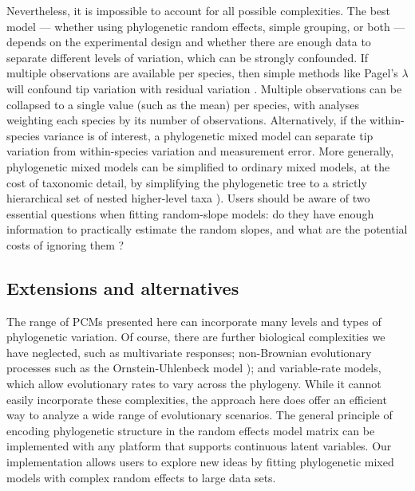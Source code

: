 \documentclass[12pt]{article}
\begin{document}
Nevertheless, it is impossible to account for all possible complexities.
The best model --- whether using phylogenetic random effects, simple grouping, or both --- depends on the experimental design and whether there are enough data to separate different levels of variation, which can be strongly confounded.
If multiple observations are available per species, then simple methods like Pagel's $\lambda$ will confound tip variation with residual variation \citep{boettiger2013is}.
Multiple observations can be collapsed to a single value (such as the mean) per species, with analyses weighting each species by its number of observations.
Alternatively, if the within-species variance is of interest, a phylogenetic mixed model can separate tip variation from within-species variation and measurement error.
More generally, phylogenetic mixed models can be simplified to ordinary mixed models, at the cost of taxonomic detail, by simplifying the phylogenetic tree to a strictly hierarchical set of nested higher-level taxa \citep{bunnefeld2012island}). 
Users should be aware of two essential questions when fitting random-slope models: do they have enough information to practically estimate the random slopes, and what are the potential costs of ignoring them \citep{schielzeth2008conclusions}? 

\subsection*{Extensions and alternatives}

The range of PCMs presented here can incorporate many levels and types of phylogenetic variation.
Of course, there are further biological complexities we have neglected, such as multivariate responses; non-Brownian evolutionary processes such as the Ornstein-Uhlenbeck model \citep{butler2004phylogenetic}); and variable-rate models, which allow evolutionary rates to vary across the phylogeny.
While it cannot easily incorporate these complexities, the approach here does offer an efficient way to analyze a wide range of evolutionary scenarios.
The general principle of encoding phylogenetic structure in the random effects model matrix can be implemented with any platform that supports continuous latent variables.
Our implementation allows users to explore new ideas by fitting phylogenetic mixed models with complex random effects to large data sets.
\end{document}
